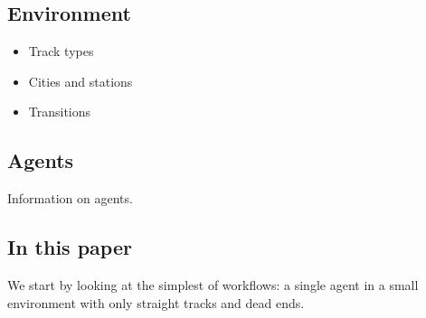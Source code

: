 \documentclass[11pt]{article}
\begin{document}
\subsection{Environment}
\begin{itemize}
  \item Track types
  \item Cities and stations
  \item Transitions
\end{itemize} 

\subsection{Agents}
Information on agents.

\subsection{In this paper}
We start by looking at the simplest of workflows: a single agent in a small environment with only straight tracks and dead ends.



\end{document}
